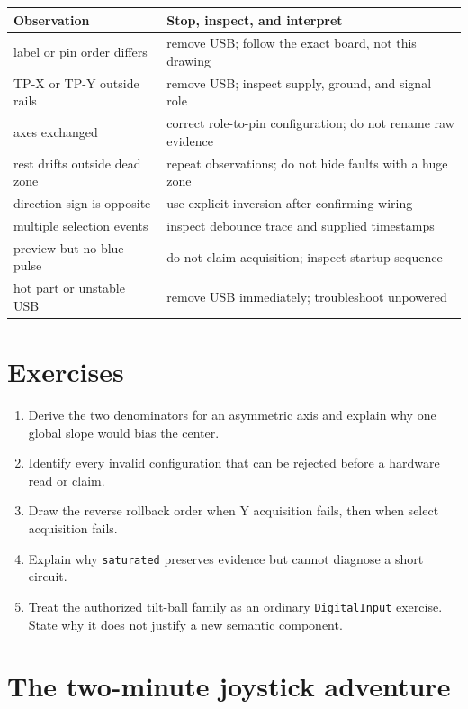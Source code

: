 \documentclass[11pt]{article}
\begin{document}
\begin{tabularx}{\linewidth}{@{}X X@{}}
\toprule
Observation & Stop, inspect, and interpret\\
\midrule
label or pin order differs & remove USB; follow the exact board, not this drawing\\
TP-X or TP-Y outside rails & remove USB; inspect supply, ground, and signal role\\
axes exchanged & correct role-to-pin configuration; do not rename raw evidence\\
rest drifts outside dead zone & repeat observations; do not hide faults with a huge zone\\
direction sign is opposite & use explicit inversion after confirming wiring\\
multiple selection events & inspect debounce trace and supplied timestamps\\
preview but no blue pulse & do not claim acquisition; inspect startup sequence\\
hot part or unstable USB & remove USB immediately; troubleshoot unpowered\\
\bottomrule
\end{tabularx}

\section{Exercises}

\begin{enumerate}
  \item Derive the two denominators for an asymmetric axis and explain why one
        global slope would bias the center.
  \item Identify every invalid configuration that can be rejected before a
        hardware read or claim.
  \item Draw the reverse rollback order when Y acquisition fails, then when
        select acquisition fails.
  \item Explain why \texttt{saturated} preserves evidence but cannot diagnose a
        short circuit.
  \item Treat the authorized tilt-ball family as an ordinary
        \texttt{DigitalInput} exercise. State why it does not justify a new
        semantic component.
\end{enumerate}

\section{The two-minute joystick adventure}
\end{document}
